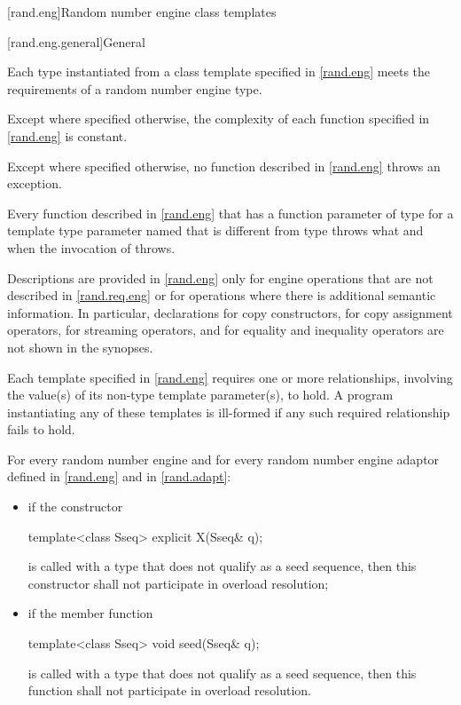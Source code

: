 [rand.eng]{Random number engine class templates}%

[rand.eng.general]{General}%

\pnum
Each type instantiated
from a class template specified in \ref{rand.eng}
meets the requirements
of a random number engine type.

\pnum
Except where specified otherwise,
the complexity of each function
specified in \ref{rand.eng}
is constant.

\pnum
Except where specified otherwise,
no function described in \ref{rand.eng}
throws an exception.

\pnum
Every function described in \ref{rand.eng}
that has a function parameter  of type 
for a template type parameter named 
that is different from type 
throws what and when the invocation of  throws.

\pnum
Descriptions are provided in \ref{rand.eng}
only for engine operations
that are not described in \ref{rand.req.eng}
or for operations where there is additional semantic information.
In particular,
declarations for copy constructors,
for copy assignment operators,
for streaming operators,
and for equality and inequality operators
are not shown in the synopses.

\pnum
Each template specified in \ref{rand.eng}
requires one or more relationships,
involving the value(s) of its non-type template parameter(s), to hold.
A program instantiating any of these templates
is ill-formed
if any such required relationship fails to hold.

\pnum
For every random number engine and for every random number engine adaptor 
defined in \ref{rand.eng} and in \ref{rand.adapt}:
\begin{itemize}
\item
if the constructor
\begin{codeblock}
template<class Sseq> explicit X(Sseq& q);
\end{codeblock}
is called with a type  that does not qualify as a seed sequence, then this
constructor shall not participate in overload resolution;

\item
if the member function
\begin{codeblock}
template<class Sseq> void seed(Sseq& q);
\end{codeblock}
is called with a type  that does not qualify as a seed sequence, then this
function shall not participate in overload resolution.
\end{itemize}


